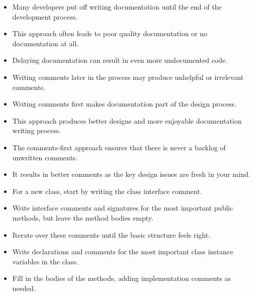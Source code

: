 
{ 
	\begin{itemize}
		\item Many developers put off writing documentation until the end of the development process.
		\item This approach often leads to poor quality documentation or no documentation at all.
		\item Delaying documentation can result in even more undocumented code.
		\item Writing comments later in the process may produce unhelpful or irrelevant comments.
	\end{itemize}
	
	
}



{ 
	
	
\begin{itemize}
	\item Writing comments first makes documentation part of the design process.
	\item This approach produces better designs and more enjoyable documentation writing process.
	\item The comments-first approach ensures that there is never a backlog of unwritten comments.
	\item It results in better comments as the key design issues are fresh in your mind.
\end{itemize}

		
}
{
	\begin{itemize}
		\item For a new class, start by writing the class interface comment.
		\item Write interface comments and signatures for the most important public methods, but leave the method bodies empty.
		\item Iterate over these comments until the basic structure feels right.
		\item Write declarations and comments for the most important class instance variables in the class.
		\item Fill in the bodies of the methods, adding implementation comments as needed.
	\end{itemize}

}
	

